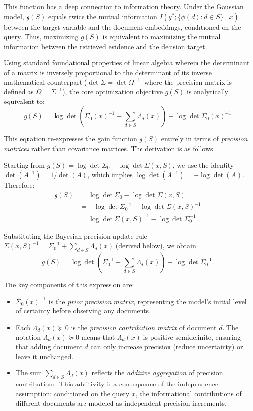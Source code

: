 \documentclass[12pt,a4paper,oneside]{report}
\theoremstyle{definition}
\theoremstyle{remark}
\begin{document}
\noindent This function has a deep connection to information theory. Under the Gaussian model, $g(S)$ equals twice the mutual information $I(y^*; \{\phi(d) : d \in S\} \mid x)$ between the target variable and the document embeddings, conditioned on the query. Thus, maximizing $g(S)$ is equivalent to maximizing the mutual information between the retrieved evidence and the decision target.

\medskip
\noindent Using standard foundational properties of linear algebra wherein the determinant of a matrix is inversely proportional to the determinant of its inverse mathematical counterpart ($\det \Sigma = \det \Omega^{-1}$, where the precision matrix is defined as $\Omega = \Sigma^{-1}$), the core optimization objective $g(S)$ is analytically equivalent to:
\begin{equation} \label{eq:idcr_gain}
g(S) = \log \det\left(\Sigma_0(x)^{-1} + \sum_{d \in S} \Lambda_d(x)\right) - \log \det \Sigma_0(x)^{-1}
\end{equation}

\medskip
\noindent This equation re-expresses the gain function $g(S)$ entirely in terms of \emph{precision matrices} rather than covariance matrices. The derivation is as follows.

Starting from $g(S) = \log \det \Sigma_0 - \log \det \Sigma(x,S)$, we use the identity $\det(A^{-1}) = 1/\det(A)$, which implies $\log \det(A^{-1}) = -\log \det(A)$. Therefore:
\begin{align*}
g(S) &= \log \det \Sigma_0 - \log \det \Sigma(x,S) \\
&= -\log \det \Sigma_0^{-1} + \log \det \Sigma(x,S)^{-1} \\
&= \log \det \Sigma(x,S)^{-1} - \log \det \Sigma_0^{-1}.
\end{align*}

Substituting the Bayesian precision update rule $\Sigma(x,S)^{-1} = \Sigma_0^{-1} + \sum_{d \in S} \Lambda_d(x)$ (derived below), we obtain:
\[
g(S) = \log \det\left(\Sigma_0^{-1} + \sum_{d \in S} \Lambda_d(x)\right) - \log \det \Sigma_0^{-1}.
\]

The key components of this expression are:
\begin{itemize}[leftmargin=2em]
  \item $\Sigma_0(x)^{-1}$ is the \emph{prior precision matrix}, representing the model's initial level of certainty before observing any documents.
  \item Each $\Lambda_d(x) \succeq 0$ is the \emph{precision contribution matrix} of document $d$. The notation $\Lambda_d(x) \succeq 0$ means that $\Lambda_d(x)$ is positive-semidefinite, ensuring that adding document $d$ can only increase precision (reduce uncertainty) or leave it unchanged.
  \item The sum $\sum_{d \in S} \Lambda_d(x)$ reflects the \emph{additive aggregation} of precision contributions. This additivity is a consequence of the independence assumption: conditioned on the query $x$, the informational contributions of different documents are modeled as independent precision increments.
\end{itemize}
\end{document}
